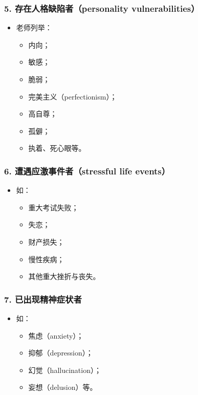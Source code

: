 \documentclass[
  chinese,
  9pt,
  a4paper,
]{ctexart}
\providecommand{\tightlist}{%
  \setlength{\itemsep}{0pt}\setlength{\parskip}{0pt}}
\begin{document}
\subsubsection{5. 存在人格缺陷者（personality
vulnerabilities）}\label{ux5b58ux5728ux4ebaux683cux7f3aux9677ux8005personality-vulnerabilities}

\begin{itemize}
\item
  老师列举：

  \begin{itemize}
  \tightlist
  \item
    内向；
  \item
    敏感；
  \item
    脆弱；
  \item
    完美主义（perfectionism）；
  \item
    高自尊；
  \item
    孤僻；
  \item
    执着、死心眼等。
  \end{itemize}
\end{itemize}

\subsubsection{6. 遭遇应激事件者（stressful life
events）}\label{ux906dux9047ux5e94ux6fc0ux4e8bux4ef6ux8005stressful-life-events}

\begin{itemize}
\item
  如：

  \begin{itemize}
  \tightlist
  \item
    重大考试失败；
  \item
    失恋；
  \item
    财产损失；
  \item
    慢性疾病；
  \item
    其他重大挫折与丧失。
  \end{itemize}
\end{itemize}

\subsubsection{7.
已出现精神症状者}\label{ux5df2ux51faux73b0ux7cbeux795eux75c7ux72b6ux8005}

\begin{itemize}
\item
  如：

  \begin{itemize}
  \tightlist
  \item
    焦虑（anxiety）；
  \item
    抑郁（depression）；
  \item
    幻觉（hallucination）；
  \item
    妄想（delusion）等。
  \end{itemize}
\end{itemize}
\end{document}
